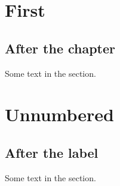 \documentclass{report}
\begin{document}
\chapter{First}
\section{After the chapter}
Some text in the section.
\chapter*{Unnumbered}\label{unnumbered}
\section*{After the label}
Some text in the section.
\end{document}
